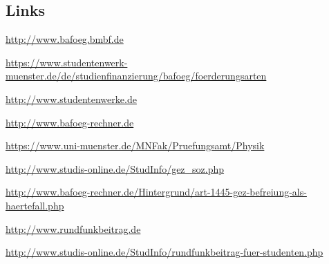 \begin{multicols*}{2}
\subsection*{Links}
\begin{flushleft}
\small
\begin{fibelurl}
	\url{http://www.bafoeg.bmbf.de}
	\label{geld:bmbf}
\end{fibelurl}
\begin{fibelurl}
	\url{https://www.studentenwerk-muenster.de/de/studienfinanzierung/bafoeg/foerderungsarten}
	\label{geld:studentenwerk-ms}
\end{fibelurl}
\begin{fibelurl}
	\url{http://www.studentenwerke.de}
	\label{geld:studentenwerke}
\end{fibelurl}
\begin{fibelurl}
	\url{http://www.bafoeg-rechner.de}
	\label{geld:bafoeg-rechner}
\end{fibelurl}
\begin{fibelurl}
	\url{https://www.uni-muenster.de/MNFak/Pruefungsamt/Physik}
	\label{geld:pa_physik}
\end{fibelurl}
\begin{fibelurl}
	\url{http://www.studis-online.de/StudInfo/gez_soz.php}
	\label{geld:gez}
\end{fibelurl}
\begin{fibelurl}
	\url{http://www.bafoeg-rechner.de/Hintergrund/art-1445-gez-befreiung-als-haertefall.php}
	\label{geld:gez_härtefall}
\end{fibelurl}
\begin{fibelurl}
	\url{http://www.rundfunkbeitrag.de}
	\label{geld:rundfunkbeitrag}
\end{fibelurl}
\begin{fibelurl}
	\url{http://www.studis-online.de/StudInfo/rundfunkbeitrag-fuer-studenten.php}
	\label{geld:rundfunkbeitrag_studenten}
\end{fibelurl}
\end{flushleft}

\end{multicols*}

